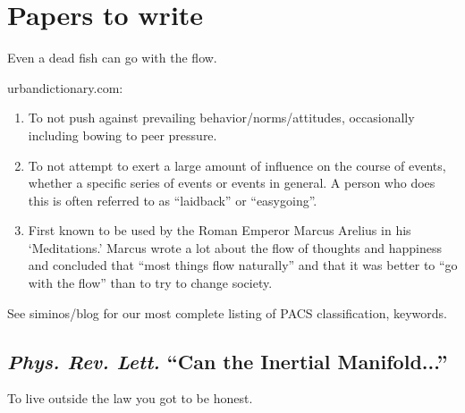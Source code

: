 \section{Papers to write}

\begin{bartlett}{
Even a dead fish can go with the flow.}
\end{bartlett}


{urbandictionary.com}:

\begin{enumerate}
   \item To not push against prevailing behavior/norms/attitudes,
   occasionally including bowing to peer pressure.

   \item To not attempt to exert a large amount of influence on the
   course of events, whether a specific series of events or events in
   general. A person who does this is often referred to as ``laidback''
   or ``easygoing''.

   \item First known to be used by the Roman Emperor Marcus Arelius in
   his `Meditations.' Marcus wrote a lot about the flow of
   thoughts and happiness and concluded that ``most things flow
   naturally'' and that it was better to ``go with the flow''
   than to try to change society.
 \end{enumerate}

See siminos/blog for our most complete listing of
PACS classification, keywords.

\subsection{\emph{Phys. Rev. Lett.} ``Can the Inertial Manifold...''}

\begin{bartlett}
To live outside the law   %
you got to be honest.
\end{bartlett}

